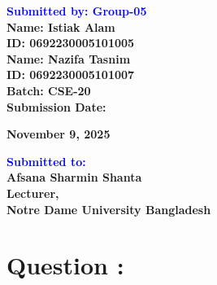 \documentclass[12pt]{article}
\begin{document}
\begin{titlepage}
\begin{center}
    \vspace{1em}
    \begin{flushleft}
        \textbf{\Huge \textcolor{blue}{Submitted by: Group-05}} \\
        \vspace{0.3cm}
        \textbf{\Large Name: Istiak Alam} \\
        \vspace{0.3cm}
        \textbf{\Large ID: 0692230005101005} \\
        \vspace{0.3cm}
        \textbf{\Large Name: Nazifa Tasnim} \\
        \vspace{0.3cm}
        \textbf{\Large ID: 0692230005101007} \\
		\vspace{0.3cm}        
        \textbf{\Large Batch: CSE-20} \\
        \vspace{0.5cm}
        \textbf{\Large Submission Date: }{\Large \textbf{November 9, 2025}\par}
    \end{flushleft}
    \vfill
    \begin{flushleft}
        \textbf{\Huge \textcolor{blue}{Submitted to:}} \\
        \vspace{0.3cm}
        \textbf{\Large Afsana Sharmin Shanta} \\
        \vspace{0.3cm}
        \textbf{\Large Lecturer,} \\
        \vspace{0.3cm}
        \textbf{\Large Notre Dame University Bangladesh}
    \end{flushleft}
\end{center}
\end{titlepage}						%



\newpage

\section*{Question :}
\end{document}
